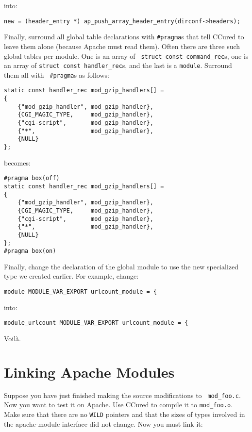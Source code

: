 \documentclass{book}
\begin{document}
into:

\begin{verbatim}
new = (header_entry *) ap_push_array_header_entry(dirconf->headers);
\end{verbatim}

Finally, surround all global table declarations with {\tt \#pragma}s that
tell CCured to leave them alone (because Apache must read them). Often
there are three such global tables per module. One is an array of {\tt
struct const command\_rec}s, one is an array of {\tt struct const
handler\_rec}s, and the last is a {\tt module}. Surround them all with {\tt
\#pragma}s as follows:

\begin{verbatim}
static const handler_rec mod_gzip_handlers[] =
{
    {"mod_gzip_handler", mod_gzip_handler},
    {CGI_MAGIC_TYPE,     mod_gzip_handler},
    {"cgi-script",       mod_gzip_handler},
    {"*",                mod_gzip_handler},
    {NULL}
};
\end{verbatim}

becomes:

\begin{verbatim}
#pragma box(off)
static const handler_rec mod_gzip_handlers[] =
{
    {"mod_gzip_handler", mod_gzip_handler},
    {CGI_MAGIC_TYPE,     mod_gzip_handler},
    {"cgi-script",       mod_gzip_handler},
    {"*",                mod_gzip_handler},
    {NULL}
};
#pragma box(on)
\end{verbatim}

Finally, change the declaration of the global module to use the new
specialized type we created earlier. For example, change:

\begin{verbatim}
module MODULE_VAR_EXPORT urlcount_module = {
\end{verbatim}

into:

\begin{verbatim}
module_urlcount MODULE_VAR_EXPORT urlcount_module = {
\end{verbatim}

Voil\`a. 

\section{Linking Apache Modules}

Suppose you have just finished making the source modifications to {\tt
mod\_foo.c}. Now you want to test it on Apache. Use CCured to compile it to
{\tt mod\_foo.o}. Make sure that there are no {\tt WILD} pointers and that 
the sizes of types involved in the apache-module interface did not change. 
Now you must link it:
\end{document}
